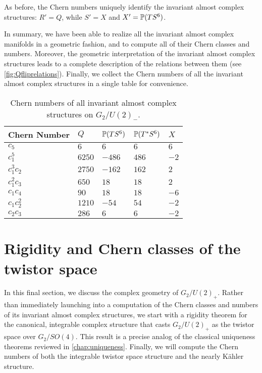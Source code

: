 As before, the Chern numbers uniquely identify the invariant almost complex structures: $R'=Q$, while $S'=X$ and $X'=\P(TS^6)$.

In summary, we have been able to realize all the invariant almost complex manifolds in a geometric fashion, and to compute all of their Chern classes and numbers. Moreover, the geometric interpretation of the invariant almost complex structures leads to a complete description of the relations between them (see \cref{fig:Qfliprelations}). Finally, we collect the Chern numbers of all the invariant almost complex structures in a single table for convenience.

\begin{table}[ht!]\centering
	\begin{tabular}{lllll} \toprule
		Chern Number& $Q$		& $\P(TS^6)$ 	& $\P(T^*S^6)$	& $X$\\ \midrule
		$c_5$ 		& $6$ 		& $6$ 			& $6$			& $6$\\
		$c_1^5$ 	& $6250$	& $-486$		& $486$			& $-2$\\
		$c_1^3c_2$	& $2750$ 	& $-162$		& $162$			& $2$\\
		$c_1^2c_3$	& $650$ 	& $18$ 			& $18$			& $2$\\
		$c_1c_4$	& $90$ 		& $18$ 			& $18$			& $-6$\\
		$c_1c_2^2$	& $1210$ 	& $-54$ 		& $54$			& $-2$\\
		$c_2c_3$	& $286$ 	& $6$			& $6$			& $-2$\\ \bottomrule
	\end{tabular}
	\caption{Chern numbers of all invariant almost complex structures on $G_2/U(2)_-$.}\label{tab:Qnumberscomplete}
\end{table}

\section{Rigidity and Chern classes of the twistor space}
\label{sec:Zrigidity}

In this final section, we discuss the complex geometry of $G_2/U(2)_+$. Rather than immediately launching into a computation of the Chern classes and numbers of its invariant almost complex structures, we start with a rigidity theorem for the canonical, integrable complex structure that casts $G_2/U(2)_+$ as the twistor space over $G_2/SO(4)$. This result is a precise analog of the classical uniqueness theorems reviewed in \cref{chap:uniqueness}. Finally, we will compute the Chern numbers of both the integrable twistor space structure and the nearly K\"ahler structure.

